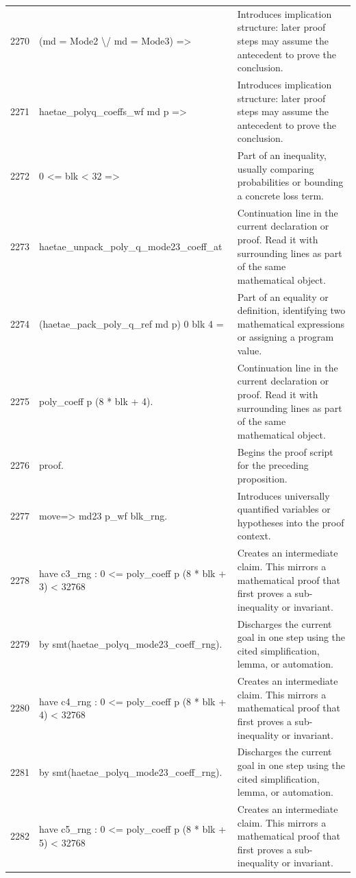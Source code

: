 \documentclass[10pt]{article}
\begin{document}
\begin{longtable}{r L{0.53\textwidth} L{0.37\textwidth}}
2270 & {\ttfamily\scriptsize   (md = Mode2 \textbackslash{}/ md = Mode3) =>} & Introduces implication structure: later proof steps may assume the antecedent to prove the conclusion. \\
2271 & {\ttfamily\scriptsize   haetae\_polyq\_coeffs\_wf md p =>} & Introduces implication structure: later proof steps may assume the antecedent to prove the conclusion. \\
2272 & {\ttfamily\scriptsize   0 <= blk < 32 =>} & Part of an inequality, usually comparing probabilities or bounding a concrete loss term. \\
2273 & {\ttfamily\scriptsize   haetae\_unpack\_poly\_q\_mode23\_coeff\_at} & Continuation line in the current declaration or proof.  Read it with surrounding lines as part of the same mathematical object. \\
2274 & {\ttfamily\scriptsize     (haetae\_pack\_poly\_q\_ref md p) 0 blk 4 =} & Part of an equality or definition, identifying two mathematical expressions or assigning a program value. \\
2275 & {\ttfamily\scriptsize   poly\_coeff p (8 * blk + 4).} & Continuation line in the current declaration or proof.  Read it with surrounding lines as part of the same mathematical object. \\
2276 & {\ttfamily\scriptsize proof.} & Begins the proof script for the preceding proposition. \\
2277 & {\ttfamily\scriptsize move=> md23 p\_wf blk\_rng.} & Introduces universally quantified variables or hypotheses into the proof context. \\
2278 & {\ttfamily\scriptsize have c3\_rng : 0 <= poly\_coeff p (8 * blk + 3) < 32768} & Creates an intermediate claim.  This mirrors a mathematical proof that first proves a sub-inequality or invariant. \\
2279 & {\ttfamily\scriptsize   by smt(haetae\_polyq\_mode23\_coeff\_rng).} & Discharges the current goal in one step using the cited simplification, lemma, or automation. \\
2280 & {\ttfamily\scriptsize have c4\_rng : 0 <= poly\_coeff p (8 * blk + 4) < 32768} & Creates an intermediate claim.  This mirrors a mathematical proof that first proves a sub-inequality or invariant. \\
2281 & {\ttfamily\scriptsize   by smt(haetae\_polyq\_mode23\_coeff\_rng).} & Discharges the current goal in one step using the cited simplification, lemma, or automation. \\
2282 & {\ttfamily\scriptsize have c5\_rng : 0 <= poly\_coeff p (8 * blk + 5) < 32768} & Creates an intermediate claim.  This mirrors a mathematical proof that first proves a sub-inequality or invariant. \\

\end{longtable}
\end{document}
